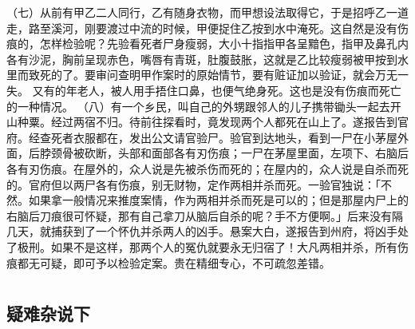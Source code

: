 \documentclass[12pt,UTF8]{ctexbook}
\begin{document}
（七）从前有甲乙二人同行，乙有随身衣物，而甲想设法取得它，于是招呼乙一道走，路至溪河，刚要渡过中流的时候，甲便捉住乙按到水中淹死。这自然是没有伤痕的，怎样检验呢？先验看死者尸身瘦弱，大小十指指甲各呈黯色，指甲及鼻孔内各有沙泥，胸前呈现赤色，嘴唇有青斑，肚腹鼓胀，这就是乙比较瘦弱被甲按到水里而致死的了。要审问查明甲作案时的原始情节，要有赃证加以验证，就会万无一失。
又有的年老人，被人用手捂住口鼻，也便气绝身死。这也是没有伤痕而死亡的一种情况。
（八）有一个乡民，叫自己的外甥跟邻人的儿子携带锄头一起去开山种粟。经过两宿不归。待前往探看时，竟发现两个人都死在山上了。遂报告到官府。经查死者衣服都在，发出公文请官验尸。验官到达地头，看到一尸在小茅屋外面，后脖颈骨被砍断，头部和面部各有刃伤痕；一尸在茅屋里面，左项下、右脑后各有刃伤痕。在屋外的，众人说是先被杀伤而死的；在屋内的，众人说是自杀而死的。官府但以两尸各有伤痕，别无财物，定作两相并杀而死。一验官独说：「不然。如果拿一般情况来推度案情，作为两相并杀而死是可以的；但是那屋内尸上的右脑后刀痕很可怀疑，那有自己拿刀从脑后自杀的呢？手不方便啊。」后来没有隔几天，就捕获到了一个怀仇并杀两人的凶手。悬案大白，遂报告到州府，将凶手处了极刑。如果不是这样，那两个人的冤仇就要永无归宿了！大凡两相并杀，所有伤痕都无可疑，即可予以检验定案。贵在精细专心，不可疏忽差错。


\part{}

\chapter{疑难杂说下}
\end{document}
